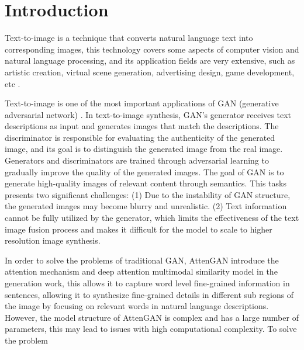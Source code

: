 \documentclass[runningheads, orivec]{llncs}
\begin{document}
\vspace{-20pt}
\section{Introduction}

Text-to-image is a technique that converts natural language text into corresponding images, this technology covers some aspects of computer vision and natural language processing, and its application fields are very extensive, such as artistic creation, virtual scene generation, advertising design, game development, etc \cite{isola2017image} \cite{gatys2015neural} \cite{karras2017progressive} \cite{frolov2021adversarial} \cite{hald2020procedural}.  

\par Text-to-image is one of the most important applications of GAN (generative adversarial network) \cite{goodfellow2020generative}. In text-to-image synthesis, GAN’s generator receives text descriptions as input and generates images that match the descriptions. The discriminator is responsible for evaluating the authenticity of the generated image, and its goal is to distinguish the generated image from the real image. Generators and discriminators are trained through adversarial learning to gradually improve the quality of the generated images. The goal of GAN is to generate high-quality images of relevant content through semantics. This tasks presents two significant challenges: (1) Due to the instability of GAN structure, the generated images may become blurry and unrealistic. (2) Text information cannot be fully utilized by the generator, which limits the effectiveness of the text image fusion process and makes it difficult for the model to scale to higher resolution image synthesis. 

\par In order to solve the problems of traditional GAN, AttenGAN introduce the attention mechanism and deep attention multimodal similarity model in the generation work, this allows it to capture word level fine-grained information in sentences, allowing it to synthesize fine-grained details in different sub regions of the image by focusing on relevant words in natural language descriptions. However, the model structure of AttenGAN is complex and has a large number of parameters, this may lead to issues with high computational complexity. To solve the problem
\end{document}
